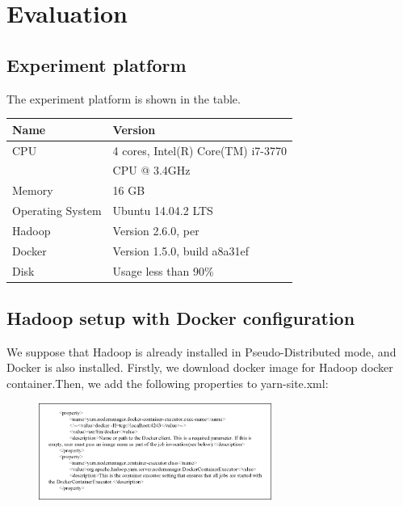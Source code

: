 \section{Evaluation}
\label{sec:eval}

\subsection{Experiment platform}

The experiment platform is shown in the table.

\begin{table}[ht]

\begin{tabular}{|l|l|}
\hline 
Name & Version \\ 
\hline 
CPU & 4 cores, Intel(R) Core(TM) i7-3770 \\
& CPU @ 3.4GHz \\ 
\hline 
Memory & 16 GB \\ 
\hline 
Operating System & Ubuntu 14.04.2 LTS \\ 
\hline 
Hadoop & Version 2.6.0, per \\ 
\hline 
Docker & Version 1.5.0, build a8a31ef \\ 
\hline 
Disk & Usage less than 90\% \\ 
\hline 
\end{tabular}
\end{table}


\subsection{Hadoop setup with Docker configuration}

We suppose that Hadoop is already installed in Pseudo-Distributed mode, and Docker is also installed. Firstly, we download docker image for Hadoop docker container.Then, we add the following properties to yarn-site.xml:

\begin{figure}[h]
  \centering
  \includegraphics[width=3in]{figs/code.eps}
  \label{fig:Codeoverview}
\end{figure}


